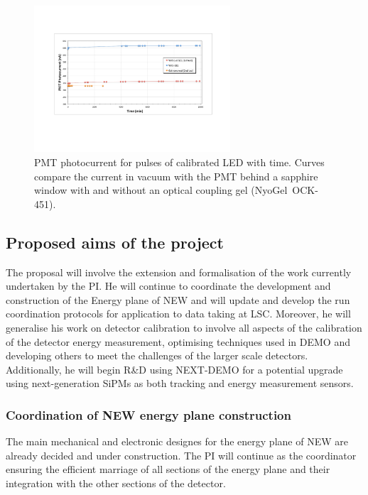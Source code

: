 \documentclass[a4paper,11pt,oneside]{article}
\begin{document}
\begin{figure}
  \begin{center}
    \includegraphics[width=0.65\textwidth]{img/gelPlot}
  \end{center}
  \caption{PMT photocurrent for pulses of calibrated LED with
    time. Curves compare the current in vacuum with the PMT behind a
    sapphire window with and without an optical coupling gel (NyoGel~OCK-451).}
  \label{fig:gelPer}
\end{figure}

\subsection*{Proposed aims of the project}
\label{subSec:Prop}
The proposal will involve the extension and formalisation of the work
currently undertaken by the PI. He will continue to coordinate the
development and construction of the Energy plane of NEW and will
update and develop the run coordination protocols for application to
data taking at LSC. Moreover, he will
generalise his work on detector calibration to involve all aspects of
the calibration of the detector energy measurement, optimising
techniques used in DEMO and developing others to meet the challenges
of the larger scale detectors. Additionally, he will begin R\&D using
NEXT-DEMO for a potential upgrade using next-generation SiPMs as both tracking and
energy measurement sensors.

\subsubsection*{Coordination of NEW energy plane construction}
The main mechanical and electronic designes for the energy plane of
NEW are already decided and under construction. The PI will continue
as the coordinator ensuring the efficient marriage of all sections
of the energy plane and their integration with the other sections of
the detector.
\end{document}
